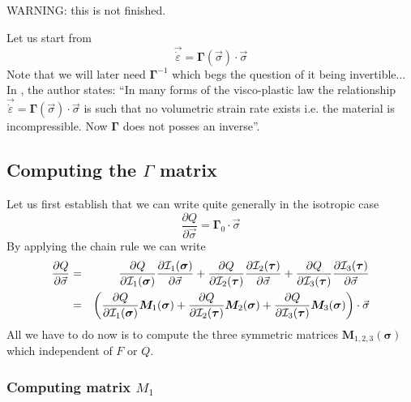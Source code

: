 

WARNING: this is not finished. 

Let us start from 
\[
\vec{\dot{\varepsilon}} = {\bm \Gamma}(\vec\sigma)\cdot \vec\sigma
\]
Note that we will later need $\bm\Gamma^{-1}$ which begs the question 
of it being invertible... 
In \textcite{zien75}, the author states: ``In many forms of the 
visco-plastic law the relationship $\vec{\dot{\varepsilon}} = {\bm \Gamma}(\vec\sigma)\cdot \vec\sigma$ is such that no volumetric strain rate 
exists i.e. the material is incompressible. 
Now ${\bm \Gamma}$ does not posses an inverse''.


\subsection{Computing the ${\Gamma}$ matrix}


Let us first establish that we can write quite generally in the isotropic case
\[
\frac{\partial Q}{\partial \vec\sigma} = {\bm \Gamma}_0 \cdot \vec{\sigma}
\]
By applying the chain rule we can write
\begin{eqnarray}
\frac{\partial Q}{\partial \vec\sigma} 
&=&
\frac{\partial Q}{\partial {\cal I}_1(\bm\sigma)} 
\frac{\partial {\cal I}_1(\bm\sigma)}{\partial \vec\sigma} 
+
\frac{\partial Q}{\partial {\cal I}_2(\bm\tau)} 
\frac{\partial {\cal I}_2(\bm\tau)}{\partial \vec\sigma}
+
\frac{\partial Q}{\partial {\cal I}_3(\bm\tau)} 
\frac{\partial {\cal I}_3(\bm\tau)}{\partial \vec\sigma} \nonumber\\
&=&\left(
\frac{\partial Q}{\partial {\cal I}_1(\bm\sigma)} {\bm M}_1(\bm\sigma)
+
\frac{\partial Q}{\partial {\cal I}_2(\bm\tau)}  {\bm M}_2(\bm\sigma)
+
\frac{\partial Q}{\partial {\cal I}_3(\bm\tau)}  {\bm M}_3(\bm\sigma)
\right) \cdot \vec\sigma
\end{eqnarray}
All we have to do now is to compute the three symmetric matrices ${\bm M}_{1,2,3}(\bm\sigma)$ which independent of $F$ or $Q$.

\subsubsection{Computing matrix $M_1$}



